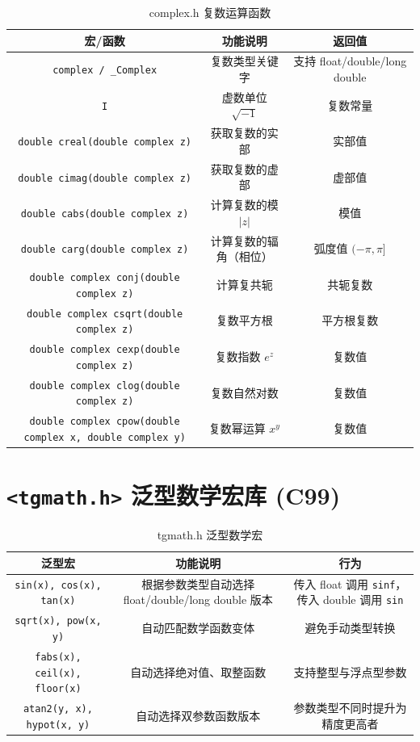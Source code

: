 \begin{table}[H]
\centering
\small
\renewcommand{\arraystretch}{1.5}
\begin{tabulary}{\linewidth}{CCC}
\toprule
\textbf{宏/函数} & \textbf{功能说明} & \textbf{返回值} \\ \midrule
\texttt{complex / \_Complex} & 复数类型关键字 & 支持 float/double/long double \\ 
\texttt{I} & 虚数单位 $\sqrt{-1}$ & 复数常量 \\ 
\texttt{double creal(double complex z)} & 获取复数的实部 & 实部值 \\ 
\texttt{double cimag(double complex z)} & 获取复数的虚部 & 虚部值 \\ 
\texttt{double cabs(double complex z)} & 计算复数的模 $|z|$ & 模值 \\ 
\texttt{double carg(double complex z)} & 计算复数的辐角（相位） & 弧度值 $(-\pi, \pi]$ \\ 
\texttt{double complex conj(double complex z)} & 计算复共轭 & 共轭复数 \\ 
\texttt{double complex csqrt(double complex z)} & 复数平方根 & 平方根复数 \\ 
\texttt{double complex cexp(double complex z)} & 复数指数 $e^z$ & 复数值 \\ 
\texttt{double complex clog(double complex z)} & 复数自然对数 & 复数值 \\ 
\texttt{double complex cpow(double complex x, double complex y)} & 复数幂运算 $x^y$ & 复数值 \\ \bottomrule
\end{tabulary}
\caption{complex.h 复数运算函数}
\label{tab:complex}
\end{table}

\section{\texorpdfstring{\texttt{<tgmath.h>} 泛型数学宏库 (C99)}{<tgmath.h> 泛型数学宏库 (C99)}}

\begin{table}[H]
\centering
\small
\renewcommand{\arraystretch}{1.5}
\begin{tabulary}{\linewidth}{CCC}
\toprule
\textbf{泛型宏} & \textbf{功能说明} & \textbf{行为} \\ \midrule
\texttt{sin(x), cos(x), tan(x)} & 根据参数类型自动选择 float/double/long double 版本 & 传入 float 调用 \texttt{sinf}，传入 double 调用 \texttt{sin} \\ 
\texttt{sqrt(x), pow(x, y)} & 自动匹配数学函数变体 & 避免手动类型转换 \\ 
\texttt{fabs(x), ceil(x), floor(x)} & 自动选择绝对值、取整函数 & 支持整型与浮点型参数 \\ 
\texttt{atan2(y, x), hypot(x, y)} & 自动选择双参数函数版本 & 参数类型不同时提升为精度更高者 \\ \bottomrule
\end{tabulary}
\caption{tgmath.h 泛型数学宏}
\label{tab:tgmath}
\end{table}

